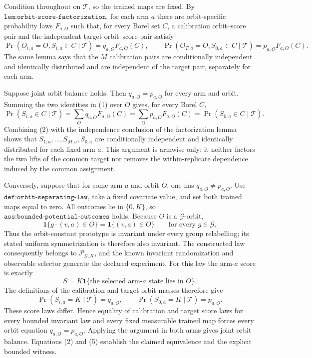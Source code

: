 Condition throughout on \(\mathcal T\), so the trained maps are fixed. By \(\texttt{lem:orbit-score-factorization}\), for each arm \(a\) there are orbit-specific probability laws \(F_{a,O}\) such that, for every Borel set \(C\), a calibration orbit--score pair and the independent target orbit--score pair satisfy
\[
\Pr(O_{i,a}=O,S_{i,a}\in C\mid\mathcal T)=q_{a,O}F_{a,O}(C),\qquad \Pr(O_{T,a}=O,S_{0,a}\in C\mid\mathcal T)=p_{a,O}F_{a,O}(C).
\tag{1}
\]
The same lemma says that the \(M\) calibration pairs are conditionally independent and identically distributed and are independent of the target pair, separately for each arm.

Suppose joint orbit balance holds. Then \(q_{a,O}=p_{a,O}\) for every arm and orbit. Summing the two identities in (1) over \(O\) gives, for every Borel \(C\),
\[
\Pr(S_{i,a}\in C\mid\mathcal T)=\sum_Oq_{a,O}F_{a,O}(C)=\sum_Op_{a,O}F_{a,O}(C)=\Pr(S_{0,a}\in C\mid\mathcal T).
\tag{2}
\]
Combining (2) with the independence conclusion of the factorization lemma shows that \(S_{1,a},\ldots,S_{M,a},S_{0,a}\) are conditionally independent and identically distributed for each fixed arm \(a\). This argument is armwise only: it neither factors the two lifts of the common target nor removes the within-replicate dependence induced by the common assignment.

Conversely, suppose that for some arm \(a\) and orbit \(O\), one has \(q_{a,O}\ne p_{a,O}\). Use \(\texttt{def:orbit-separating-law}\), take a fixed covariate value, and set both trained maps equal to zero. All outcomes lie in \(\{0,K\}\), so \(\texttt{ass:bounded-potential-outcomes}\) holds. Because \(O\) is a \(\mathcal G\)-orbit,
\[
\mathbf 1\{g\cdot(v,a)\in O\}=\mathbf 1\{(v,a)\in O\}\qquad\text{for every }g\in\mathcal G.
\tag{3}
\]
Thus the orbit-constant prototype is invariant under every group relabelling; its stated uniform symmetrization is therefore also invariant. The constructed law consequently belongs to \(\mathcal P_{\mathcal G,K}\), and the known invariant randomization and observable selector generate the declared experiment. For this law the arm-\(a\) score is exactly
\[
S=K\mathbf 1\{\text{the selected arm-}a\text{ state lies in }O\}.
\tag{4}
\]
The definitions of the calibration and target orbit masses therefore give
\[
\Pr(S_{i,a}=K\mid\mathcal T)=q_{a,O},\qquad \Pr(S_{0,a}=K\mid\mathcal T)=p_{a,O}.
\tag{5}
\]
These score laws differ. Hence equality of calibration and target score laws for every bounded invariant law and every fixed measurable trained map forces every orbit equation \(q_{a,O}=p_{a,O}\). Applying the argument in both arms gives joint orbit balance. Equations (2) and (5) establish the claimed equivalence and the explicit bounded witness.